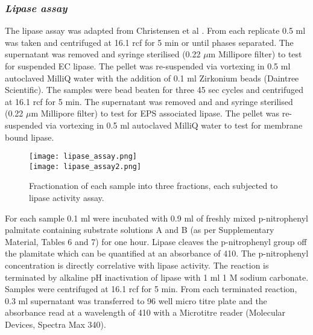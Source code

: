 \documentclass[twoside]{article}
\begin{document}
\subsubsection{\emph{Lipase assay}}
The lipase assay was adapted from Christensen et al \cite{christensen_03}. From each replicate 0.5 ml was taken and centrifuged at 16.1 rcf for 5 min or until phases separated. The supernatant was removed and syringe sterilised (0.22 $\mu$m Millipore filter) to test for suspended EC lipase.
The pellet was re-suspended via vortexing in 0.5 ml autoclaved MilliQ water with the addition of 0.1 ml Zirkonium beads (Daintree Scientific). The samples were bead beaten for three 45 sec cycles and centrifuged at 16.1 rcf for 5 min. The supernatant was removed and and syringe sterilised (0.22 $\mu$m Millipore filter) to test for EPS associated lipase.
The pellet was re-suspended via vortexing in 0.5 ml autoclaved MilliQ water to test for membrane bound lipase.\\


\begin{figure}
\begin{center}
\texttt{[image: lipase\_assay.png]}\\
\texttt{[image: lipase\_assay2.png]}
\caption{Fractionation of each sample into three fractions, each subjected to lipase activity assay.}
\end{center}
\end{figure}

For each sample 0.1 ml were incubated with 0.9 ml of freshly mixed p-nitrophenyl palmitate containing substrate solutions A and B (as per Supplementary Material, Tables 6 and 7) for one hour. Lipase cleaves the p-nitrophenyl group off the plamitate which can be quantified at an absorbance of 410. The p-nitrophenyl concentration is directly correlative with lipase activity. The reaction is terminated by alkaline pH inactivation of lipase with 1 ml 1 M sodium carbonate. Samples were centrifuged at 16.1 rcf for 5 min. From each terminated reaction, 0.3 ml supernatant was transferred to 96 well micro titre plate and the absorbance read at a wavelength of 410 with a Microtitre reader (Molecular Devices, Spectra Max 340).
\FloatBarrier
\end{document}
